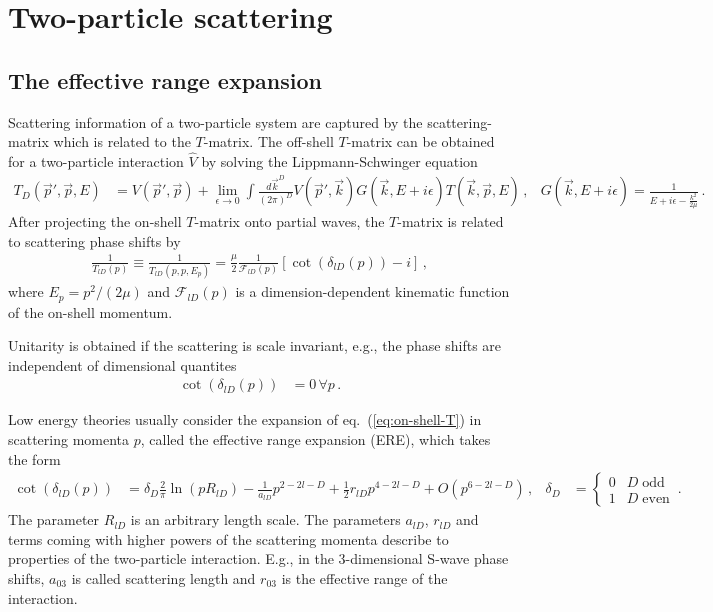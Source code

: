 \section{Two-particle scattering}

\subsection{The effective range expansion}
Scattering information of a two-particle system are captured by the scattering-matrix which is related to the $T$-matrix.
The off-shell $T$-matrix can be obtained for a two-particle interaction $\hat V$ by solving the Lippmann-Schwinger equation
\begin{align}
	T_D(\vec p', \vec p, E)
	&=
	V(\vec p', \vec p) + \lim\limits_{\epsilon \to 0}\int \frac{d \vec k^D}{(2\pi)^D} V(\vec p', \vec k) G(\vec k, E + i \epsilon) T(\vec k, \vec p, E) \, ,
	&
	G(\vec k, E+ i \epsilon) = \frac{1}{E + i \epsilon - \frac{k^2}{2\mu}}
	\, .
\end{align}
After projecting the on-shell $T$-matrix onto partial waves,
the $T$-matrix is related to scattering phase shifts by
\begin{align}\label{eq:on-shell-T}
	\frac{1}{T_{lD}(p)}
    \equiv
    \frac{1}{T_{lD}(p, p, E_p)}
    = \frac{\mu}{2}
    \frac{1}{\mathcal F_{l D}(p)} \left[\cot (\delta_{l D}(p)) - i\right] \, ,
\end{align}
where $E_p = p^2 / (2 \mu)$ and $\mathcal F_{l D}(p)$ is a dimension-dependent kinematic function of the on-shell momentum.

Unitarity is obtained if the scattering is scale invariant, e.g., the phase shifts are independent of dimensional quantites
\begin{align}
    \cot (\delta_{l D}(p)) &= 0
    \, \forall p\,.
\end{align}

Low energy theories usually consider the expansion of eq.~(\ref{eq:on-shell-T}) in scattering momenta $p$, called the effective range expansion (ERE), which takes the form \cite{Hammer:2010fw}
\begin{align}
    \cot \left(\delta_{l D}(p)\right)
    &=
    \delta_D \frac{2}{\pi}  \ln \left(p R_{l D}\right)
    -
    \frac{1}{a_{l D}} p^{2 - 2 l - D} +\frac{1}{2} r_{l D} p^{4 - 2 l - D} + O\left(p^{6 - 2 l - D}\right)
    \, , &
    \delta_D &= \begin{cases}
        0 & D \;\text{odd} \\ 1 & D \;\text{even}
    \end{cases}
    \, .
\end{align}
The parameter $R_{l D}$ is an arbitrary length scale.
The parameters $a_{l D}$, $r_{l D}$ and terms coming with higher powers of the scattering momenta describe to properties of the two-particle interaction.
E.g., in the 3-dimensional S-wave phase shifts, $a_{03}$ is called scattering length and $r_{0 3}$ is the effective range of the interaction.